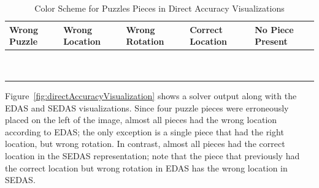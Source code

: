 \documentclass{report}
\begin{document}
\begin{table}[h]

\begin{center}
  \begin{tabular}{ | >{\centering\arraybackslash}m{0.6in} | >{\centering\arraybackslash}m{0.6in} | >{\centering\arraybackslash}m{0.6in} | >{\centering\arraybackslash}m{0.6in} | >{\centering\arraybackslash}m{0.6in} | }
 \hline
    Wrong Puzzle & Wrong Location & Wrong Rotation & Correct Location  & No Piece Present  \\ \hline
	{\cellcolor{blue}~} & {\cellcolor{red}~}  & {\cellcolor{orange}~}  & {\cellcolor{green}~} & {\cellcolor{black}~}  \\
	{\cellcolor{blue}~} & {\cellcolor{red}~}  & {\cellcolor{orange}~}  & {\cellcolor{green}~} & {\cellcolor{black}~} \\
 \hline
  \end{tabular}
\end{center}
\caption{Color Scheme for Puzzles Pieces in Direct Accuracy Visualizations}\label{tab:directAccuracyColors}
\end{table}

Figure~\ref{fig:directAccuracyVisualization} shows a solver output along with the EDAS and SEDAS visualizations. Since four puzzle pieces were erroneously placed on the left of the image, almost all pieces had the wrong location according to EDAS; the only exception is a single piece that had the right location, but wrong rotation.  In contrast, almost all pieces had the correct location in the SEDAS representation; note that the piece that previously had the correct location but wrong rotation in EDAS has the wrong location in SEDAS.
\end{document}
